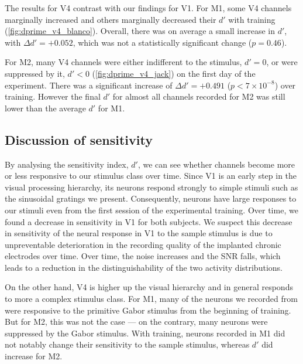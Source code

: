 The results for \ac{V4} contrast with our findings for \ac{V1}.
For \ac{M1}, some \ac{V4} channels marginally increased and others marginally decreased their $d'$ with training (\autoref{fig:dprime_v4_blanco}).
Overall, there was on average a small increase in $d'$, with $\Delta d' = +0.052$, which was not a statistically significant change ($p=0.46$).

For \ac{M2}, many \ac{V4} channels were either indifferent to the stimulus, $d'=0$, or were suppressed by it, $d'<0$ (\autoref{fig:dprime_v4_jack}) on the first day of the experiment.
There was a significant increase of $\Delta d' = +0.491$ ($p < 7 \times 10 ^{-8}$) over training.
However the final $d'$ for almost all channels recorded for \ac{M2} was still lower than the average $d'$ for \ac{M1}.


\subsection{Discussion of sensitivity}
\label{sec:pl_dprime_discuss}

By analysing the sensitivity index, $d'$, we can see whether channels become more or less responsive to our stimulus class over time.
Since \ac{V1} is an early step in the visual processing hierarchy, its neurons respond strongly to simple stimuli such as the sinusoidal gratings we present.
Consequently, neurons have large responses to our stimuli even from the first session of the experimental training.
Over time, we found a decrease in sensitivity in \ac{V1} for both subjects.
We suspect this decrease in sensitivity of the neural response in \ac{V1} to the sample stimulus is due to unpreventable deterioration in the recording quality of the implanted chronic electrodes over time.
Over time, the noise increases and the \ac{SNR} falls, which leads to a reduction in the distinguishability of the two activity distributions.

On the other hand, \ac{V4} is higher up the visual hierarchy and in general responds to more a complex stimulus class.
For \ac{M1}, many of the neurons we recorded from were responsive to the primitive Gabor stimulus from the beginning of training.
But for \ac{M2}, this was not the case --- on the contrary, many neurons were suppressed by the Gabor stimulus.
With training, neurons recorded in \ac{M1} did not notably change their sensitivity to the sample stimulus, whereas $d'$ did increase for \ac{M2}.

